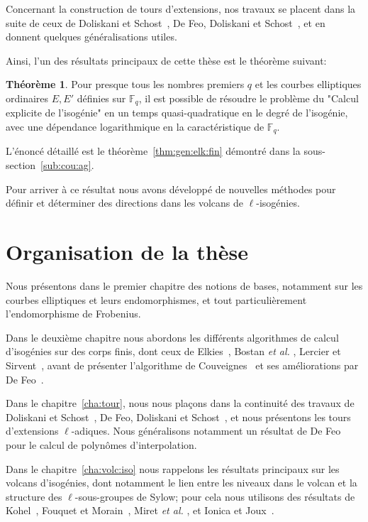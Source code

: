 \documentclass[10pt,a4paper]{book}
\theoremstyle{plain}
\theoremstyle{definition}
\newtheorem*{thm*}{Théorème}
\theoremstyle{definition}
\theoremstyle{definition}
\theoremstyle{definition}
\theoremstyle{definition}
\theoremstyle{remark}
\theoremstyle{remark}
\theoremstyle{definition}
\begin{document}
Concernant la construction de tours d'extensions, nos travaux se placent dans 
la suite de ceux de Doliskani et Schost~\cite{Doliskani-Schost15}, De Feo, 
Doliskani et Schost~\cite{DeFeo-Doliskani-Schost13}, et en donnent quelques 
généralisations utiles.

Ainsi, l'un des résultats principaux de cette thèse est le théorème suivant:
\begin{thm*}
Pour presque tous les nombres premiers $q$ et les courbes elliptiques 
ordinaires $E,E'$ définies sur 
$\mathbb{F}_q$, il est possible de résoudre le problème du "Calcul explicite de
l'isogénie" en un temps quasi-quadratique en le degré de l'isogénie, 
avec une dépendance logarithmique en la caractéristique de $\mathbb{F}_q$.
\end{thm*}
L'énoncé détaillé est le théorème~\ref{thm:gen:elk:fin} démontré dans la 
sous-section~\ref{sub:cou:ag}.

Pour arriver à ce résultat nous avons développé de nouvelles méthodes pour 
définir et déterminer des directions dans les volcans de $\ell$-isogénies.

\section*{Organisation de la thèse}
Nous présentons dans le premier chapitre des notions de bases, notamment 
sur les courbes elliptiques et leurs endomorphismes, et tout particulièrement 
l'endomorphisme de Frobenius. 

Dans le deuxième chapitre nous abordons les différents algorithmes de calcul 
d'isogénies sur des corps finis, dont ceux de Elkies~\cite{Elkies1998}, Bostan 
\textit{et al.} \cite{BMSS08}, Lercier et Sirvent~\cite{Lercier-Sirvent2008}, avant de 
présenter l'algorithme de Couveignes~\cite{Couveignes96} et ses améliorations 
par De Feo~\cite{DeFeo11}. 

Dans le chapitre~\ref{cha:tour}, nous nous plaçons dans la continuité des 
travaux de Doliskani et Schost~\cite{Doliskani-Schost15}, De Feo, Doliskani et 
Schost~\cite{DeFeo-Doliskani-Schost13}, et nous présentons les tours 
d'extensions $\ell$-adiques. Nous généralisons notamment un résultat de De 
Feo~\cite{DeFeo11} pour le calcul de polynômes d'interpolation. 

Dans le chapitre~\ref{cha:volc:iso} nous rappelons les résultats principaux sur les volcans 
d'isogénies, dont notamment le lien entre les niveaux dans le
volcan et la structure des $\ell$-sous-groupes de Sylow; pour cela nous utilisons
des résultats de Kohel~\cite{Kohel96}, Fouquet et Morain~\cite{FouquetMorain02}, Miret \textit{et al.} \cite{MiretMRV05} \cite{MiretMSTV06} 
\cite{MiretMSTV08}, et Ionica et Joux~\cite{Ionica-Joux10}. 
\end{document}
